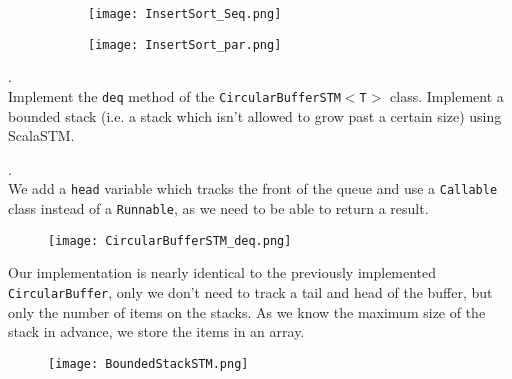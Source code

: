 \documentclass[main]{subfiles}
\begin{document}
\begin{ExerciseList}
            \begin{figure}[H]
                \centering
                \begin{subfigure}{.5\textwidth}
                    \centering
                    \texttt{[image: InsertSort\_Seq.png]}
                    \caption{}
                \end{subfigure}%
                \begin{subfigure}{.5\textwidth}
                    \centering
                    \texttt{[image: InsertSort\_par.png]}
                    \caption{}
                \end{subfigure}
            \end{figure}
    
    
    \Exercise[title={Software Transactional Memory}, label=STM]. \quad \\
        \Question Implement the \texttt{deq} method of the \texttt{CircularBufferSTM$<$T$>$} class.
        \Question Implement a bounded stack (i.e. a stack which isn't allowed to grow past a certain size) using ScalaSTM.
    
    \Answer[ref={STM}]. \quad \\
        \Question We add a \texttt{head} variable which tracks the front of the queue and use a \texttt{Callable} class instead of a \texttt{Runnable}, as we need to be able to return a result.
            \begin{figure}[H]
                \centering
                \texttt{[image: CircularBufferSTM\_deq.png]}
            \end{figure}
        \Question Our implementation is nearly identical to the previously implemented \texttt{CircularBuffer}, only we don't need to track a tail and head of the buffer, but only the number of items on the stacks. As we know the maximum size of the stack in advance, we store the items in an array.
            \begin{figure}[H]
                \centering
                \texttt{[image: BoundedStackSTM.png]}
            \end{figure}


\end{ExerciseList}
\end{document}
